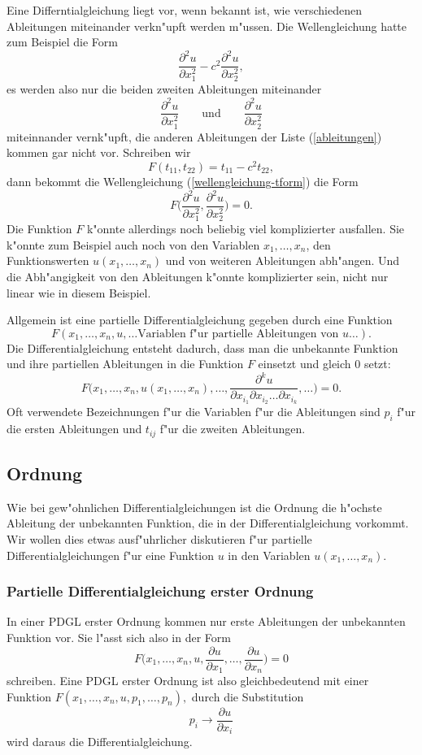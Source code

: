Eine Differntialgleichung liegt vor, wenn bekannt ist, wie verschiedenen
Ableitungen miteinander verkn"upft werden m"ussen.
Die Wellengleichung hatte zum Beispiel die Form
\begin{equation}
\frac{\partial^2 u}{\partial x_1^2}
-
c^2\frac{\partial^2 u}{\partial x_2^2},
\label{wellengleichung-tform}
\end{equation}
es werden also nur die beiden zweiten Ableitungen miteinander
\[
\frac{\partial^2 u}{\partial x_1^2}
\qquad
\text{und}
\qquad
\frac{\partial^2 u}{\partial x_2^2}
\]
miteinnander vernk"upft, die anderen Ableitungen der Liste
(\ref{ableitungen}) kommen gar nicht vor.
Schreiben wir
\[
F(t_{11}, t_{22}) = t_{11} -c^2t_{22},
\]
dann bekommt die Wellengleichung (\ref{wellengleichung-tform})
die Form
\[
F\biggl(
\frac{\partial^2 u}{\partial x_1^2},
\frac{\partial^2 u}{\partial x_2^2}
\biggr)=0.
\]
Die Funktion $F$ k"onnte allerdings noch beliebig viel komplizierter
ausfallen.
Sie k"onnte zum Beispiel auch noch von den Variablen $x_1,\dots,x_n$,
den Funktionswerten $u(x_1,\dots,x_n)$ und von weiteren Ableitungen
abh"angen.
Und die Abh"angigkeit von den Ableitungen k"onnte komplizierter sein,
nicht nur linear wie in diesem Beispiel.

Allgemein ist eine partielle Differentialgleichung gegeben
durch eine Funktion
\[
F(x_1,\dots,x_n,u,\dots\text{Variablen f"ur partielle Ableitungen von $u$}\dots).
\]
Die Differentialgleichung
entsteht dadurch, dass man die unbekannte Funktion
und ihre partiellen Ableitungen in die Funktion $F$ einsetzt und
gleich $0$ setzt:
\[
F\biggl(x_1,\dots,x_n,u(x_1,\dots,x_n),\dots,
\frac{\partial^k u}{\partial x_{i_1}\partial x_{i_2}\dots \partial x_{i_k}},\dots\biggr)=0.
\]
Oft verwendete Bezeichnungen f"ur die Variablen f"ur die Ableitungen sind
$p_i$ f"ur die ersten Ableitungen und $t_{ij}$ f"ur die zweiten Ableitungen.


\subsection{Ordnung\label{klassifikation:ordnung}}
Wie bei gew"ohnlichen Differentialgleichungen ist die Ordnung
die h"ochste Ableitung der unbekannten Funktion, die in der
Differentialgleichung vorkommt. Wir wollen dies etwas ausf"uhrlicher
diskutieren f"ur partielle Differentialgleichungen f"ur eine Funktion
$u$ in den Variablen $u(x_1,\dots,x_n)$.

\subsubsection{Partielle Differentialgleichung erster Ordnung}
In einer PDGL erster Ordnung kommen nur erste Ableitungen der
unbekannten Funktion vor.
Sie l"asst sich also in der Form 
\[
F\biggl(x_1,\dots,x_n, u, \frac{\partial u}{\partial x_1},\dots,\frac{\partial u}{\partial x_n}\biggr)=0
\]
schreiben. Eine PDGL erster Ordnung ist also gleichbedeutend mit einer
Funktion 
$F(x_1,\dots,x_n,u,p_1,\dots,p_n),$
durch die Substitution
\[
p_i\to \frac{\partial u}{\partial x_i}
\]
wird daraus die Differentialgleichung.

